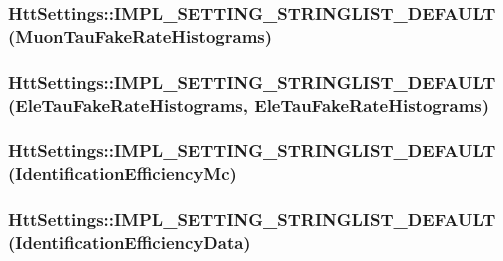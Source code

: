 \label{classHttSettings_ae9f77a258468ff234e15c2746addbe38}
\hypertarget{classHttSettings_a5b32353f2911a93bd6046427ee91f59c}{
\subsubsection[{IMPL\_\-SETTING\_\-STRINGLIST\_\-DEFAULT}]{\setlength{\rightskip}{0pt plus 5cm}HttSettings::IMPL\_\-SETTING\_\-STRINGLIST\_\-DEFAULT (MuonTauFakeRateHistograms)}}
\label{classHttSettings_a5b32353f2911a93bd6046427ee91f59c}
\hypertarget{classHttSettings_a0de597dd7ea6c06a46a6f03ad93b037d}{
\subsubsection[{IMPL\_\-SETTING\_\-STRINGLIST\_\-DEFAULT}]{\setlength{\rightskip}{0pt plus 5cm}HttSettings::IMPL\_\-SETTING\_\-STRINGLIST\_\-DEFAULT ({\bf EleTauFakeRateHistograms}, \/  {\bf EleTauFakeRateHistograms})}}
\label{classHttSettings_a0de597dd7ea6c06a46a6f03ad93b037d}
\hypertarget{classHttSettings_a46e815a98145369bfafc8ce14f6973c8}{
\subsubsection[{IMPL\_\-SETTING\_\-STRINGLIST\_\-DEFAULT}]{\setlength{\rightskip}{0pt plus 5cm}HttSettings::IMPL\_\-SETTING\_\-STRINGLIST\_\-DEFAULT (IdentificationEfficiencyMc)}}
\label{classHttSettings_a46e815a98145369bfafc8ce14f6973c8}
\hypertarget{classHttSettings_a2e6b5492e8fb2a12a4acdd8239e8635e}{
\subsubsection[{IMPL\_\-SETTING\_\-STRINGLIST\_\-DEFAULT}]{\setlength{\rightskip}{0pt plus 5cm}HttSettings::IMPL\_\-SETTING\_\-STRINGLIST\_\-DEFAULT (IdentificationEfficiencyData)}}
